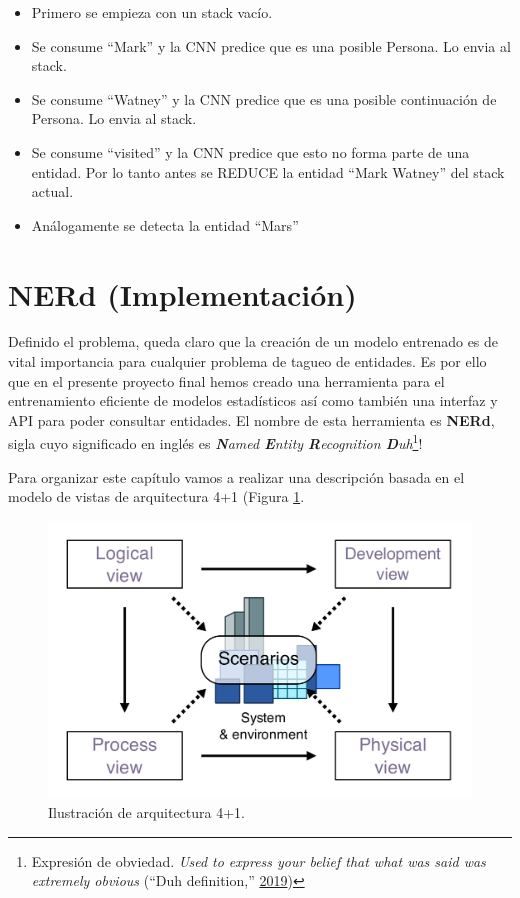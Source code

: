 \documentclass[12pt,a4paper,]{scrartcl}
\providecommand{\tightlist}{%
  \setlength{\itemsep}{0pt}\setlength{\parskip}{0pt}}
\let\rmarkdownfootnote\footnote%
\def\footnote{\protect\rmarkdownfootnote}
\begin{document}
\begin{itemize}
\tightlist
\item
  Primero se empieza con un stack vacío.
\item
  Se consume \enquote{Mark} y la CNN predice que es una posible Persona. Lo envia al stack.
\item
  Se consume \enquote{Watney} y la CNN predice que es una posible continuación de Persona. Lo envia al stack.
\item
  Se consume \enquote{visited} y la CNN predice que esto no forma parte de una entidad. Por lo tanto antes se REDUCE la entidad \enquote{Mark Watney} del stack actual.
\item
  Análogamente se detecta la entidad \enquote{Mars}
\end{itemize}

\newpage

\hypertarget{implementation}{%
\section{NERd (Implementación)}\label{implementation}}

Definido el problema, queda claro que la creación de un modelo entrenado es de vital importancia para cualquier problema de tagueo de entidades.
Es por ello que en el presente proyecto final hemos creado una herramienta para el entrenamiento eficiente de modelos estadísticos así como también una interfaz y API para poder consultar entidades.
El nombre de esta herramienta es \textbf{NERd}, sigla cuyo significado en inglés es \emph{\textbf{N}amed \textbf{E}ntity \textbf{R}ecognition \textbf{D}uh}\footnote{Expresión de obviedad. \emph{Used to express your belief that what was said was extremely obvious} (``Duh definition,'' \protect\hyperlink{ref-cambridge_duh}{2019})}!

Para organizar este capítulo vamos a realizar una descripción basada en el modelo de vistas de arquitectura 4+1 (Figura \ref{fig:arq41}.

\begin{figure}[H]

{\centering \includegraphics{assets/4+1_Architectural_View_Model.pdf} 

}

\caption{Ilustración de arquitectura 4+1.}\label{fig:arq41}
\end{figure}
\end{document}
